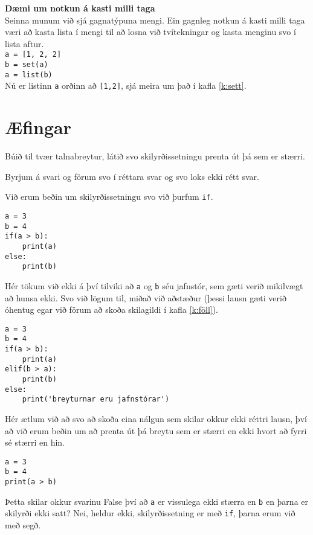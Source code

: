 \begin{itarefni}
\textbf{Dæmi um notkun á kasti milli taga}\\
Seinna munum við sjá gagnatýpuna mengi.
Ein gagnleg notkun á kasti milli taga væri að kasta lista í mengi til að losna við tvítekningar og kasta menginu svo í lista aftur.\\
\texttt{a = [1, 2, 2]}\\
\texttt{b = set(a)}\\
\texttt{a = list(b)}\\
Nú er listinn \texttt{a} orðinn að \texttt{[1,2]}, sjá meira um það í kafla \ref{k:sett}.
\end{itarefni}





\newpage
\section{Æfingar}
\begin{exercise}\label{exp1}
Búið til tvær talnabreytur, látið svo skilyrðissetningu prenta út þá sem er stærri.
\end{exercise}
\begin{Answer}[ref={exp1}]
Byrjum á svari og förum svo í réttara svar og svo loks ekki rétt svar.

Við erum beðin um skilyrðissetningu svo við þurfum \texttt{if}.
\begin{lstlisting}
a = 3
b = 4
if(a > b):
	print(a)
else:
	print(b)\end{lstlisting}

Hér tökum við ekki á því tilviki að \texttt{a} og \texttt{b} séu jafnstór, sem gæti verið mikilvægt að hunsa ekki.
Svo við lögum til, miðað við aðstæður (þessi lausn gæti verið óhentug egar við förum að skoða skilagildi í kafla \ref{k:föll}).
\begin{lstlisting}
a = 3
b = 4
if(a > b):
	print(a)
elif(b > a):
	print(b)
else:
	print('breyturnar eru jafnstórar')\end{lstlisting}

	
Hér ætlum við að svo að skoða eina nálgun sem skilar okkur ekki réttri lausn, því að við erum beðin um að prenta út þá breytu sem er stærri en ekki hvort að fyrri sé stærri en hin.
\begin{lstlisting}
a = 3
b = 4
print(a > b)\end{lstlisting}
Þetta skilar okkur svarinu False því að \texttt{a} er vissulega ekki stærra en \texttt{b} en þarna er skilyrði ekki satt?
Nei, heldur ekki, skilyrðissetning er með \texttt{if}, þarna erum við með segð.
\end{Answer}

